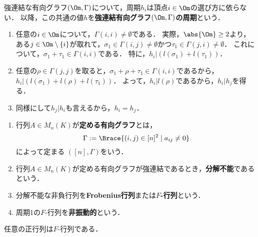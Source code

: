 \documentclass[uplatex, dvipdfmx]{jsreport}
\begin{document}
\begin{proposition}[強連結有向グラフの周期]
    強連結な有向グラフ$(\Om,\Gamma)$について，周期$h_i$は頂点$i\in\Om$の選び方に依らない．
    以降，この共通の値$h$を\textbf{強連結有向グラフ$(\Om,\Gamma)$の周期}という．
\end{proposition}
\begin{Proof}\mbox{}
    \begin{enumerate}[{Step}1]
        \item 任意の$i\in\Om$について，$\Gamma(i,i)\ne\emptyset$である．
        実際，$\abs{\Om}\ge2$より，ある$j\in\Om\setminus\{i\}$が取れて，$\sigma_1\in\Gamma(i,j)\ne\emptyset$かつ$\tau_1\in\Gamma(j,i)\ne\emptyset$．
        これについて，$\sigma_1+\tau_1\in\Gamma(i,i)$である．
        特に，$h_i|(l(\sigma_1)+l(\tau_1))$．
        \item 任意の$\rho\in\Gamma(j,j)$を取ると，$\sigma_1+\rho+\tau_1\in\Gamma(i,i)$であるから，$h_i|(l(\sigma_1)+l(\rho)+l(\tau_1))$．
        よって，$h_i|l(\rho)$であるから，$h_i|h_j$を得る．
        \item 同様にして$h_j|h_i$も言えるから，$h_i=h_j$．
    \end{enumerate}
\end{Proof}

\begin{definition}\mbox{}
    \begin{enumerate}
        \item 行列$A\in M_n(K)$が\textbf{定める有向グラフ}とは，
        \[\Gamma:=\Brace{(i,j)\in[n]^2\mid a_{ij}\ne0}\]
        によって定まる
        $([n],\Gamma)$をいう．
        \item 行列$A\in M_n(K)$が定める有向グラフが強連結であるとき，\textbf{分解不能}であるという．
        \item 分解不能な非負行列を\textbf{Frobenius行列}または\textbf{$F$-行列}という．
        \item 周期1の$F$-行列を\textbf{非振動的}という．
    \end{enumerate}
    任意の正行列は$F$-行列である．
\end{definition}
\end{document}

